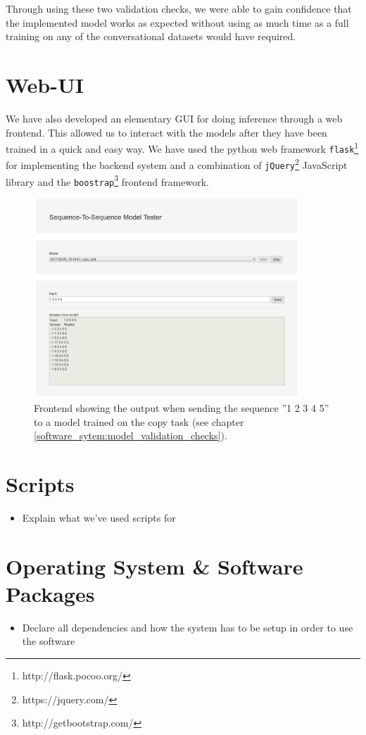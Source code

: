 Through using these two validation checks, we were able to gain confidence that the implemented model works as expected without using as much time as a full training on any of the conversational datasets would have required.

\section{Web-UI}
We have also developed an elementary GUI for doing inference through a web frontend. This allowed us to interact with the models after they have been trained in a quick and easy way. We have used the python web framework \texttt{flask}\footnote{http://flask.pocoo.org/} for implementing the backend system and a combination of \texttt{jQuery}\footnote{https://jquery.com/} JavaScript library and the \texttt{boostrap}\footnote{http://getbootstrap.com/} frontend framework.

\begin{figure}[H]
	\centering
	\includegraphics[width=10cm]{img/web_frontend_inference}
	\caption{Frontend showing the output when sending the sequence ''1 2 3 4 5'' to a model trained on the copy task (see chapter \ref{software_sytem:model_validation_checks}).}
\end{figure}

\section{Scripts}
\begin{itemize}
	\item Explain what we've used scripts for
\end{itemize}

\section{Operating System \& Software Packages}
\begin{itemize}
	\item Declare all dependencies and how the system has to be setup in order to use the software
\end{itemize}

